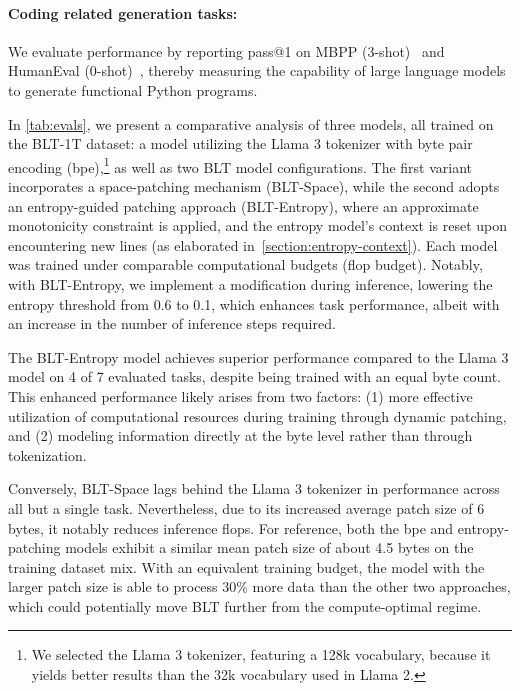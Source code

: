 \paragraph{Coding related generation tasks:} We evaluate performance by reporting pass@1 on MBPP (3-shot)~\citep{Eval_MBPP} and HumanEval (0-shot)~\citep{Eval_HumanEval}, thereby measuring the capability of large language models to generate functional Python programs.

In \autoref{tab:evals}, we present a comparative analysis of three models, all trained on the {\textsc BLT}-1T dataset: a model utilizing the Llama 3 tokenizer with byte pair encoding (bpe),\footnote{We selected the Llama 3 tokenizer, featuring a 128k vocabulary, because it yields better results than the 32k vocabulary used in Llama 2.} as well as two {\textsc BLT} model configurations. The first variant incorporates a space-patching mechanism ({\textsc BLT}-Space), while the second adopts an entropy-guided patching approach ({\textsc BLT}-Entropy), where an approximate monotonicity constraint is applied, and the entropy model’s context is reset upon encountering new lines (as elaborated in~\autoref{section:entropy-context}). Each model was trained under comparable computational budgets (flop budget). Notably, with {\textsc BLT}-Entropy, we implement a modification during inference, lowering the entropy threshold from 0.6 to 0.1, which enhances task performance, albeit with an increase in the number of inference steps required.

The {\textsc BLT}-Entropy model achieves superior performance compared to the Llama 3 model on 4 of 7 evaluated tasks, despite being trained with an equal byte count. This enhanced performance likely arises from two factors: (1) more effective utilization of computational resources during training through dynamic patching, and (2) modeling information directly at the byte level rather than through tokenization.

Conversely, {\textsc BLT}-Space lags behind the Llama 3 tokenizer in performance across all but a single task. Nevertheless, due to its increased average patch size of 6 bytes, it notably reduces inference flops. For reference, both the bpe and entropy-patching models exhibit a similar mean patch size of about 4.5 bytes on the training dataset mix. With an equivalent training budget, the model with the larger patch size is able to process 30\% more data than the other two approaches, which could potentially move {\textsc BLT} further from the compute-optimal regime.

